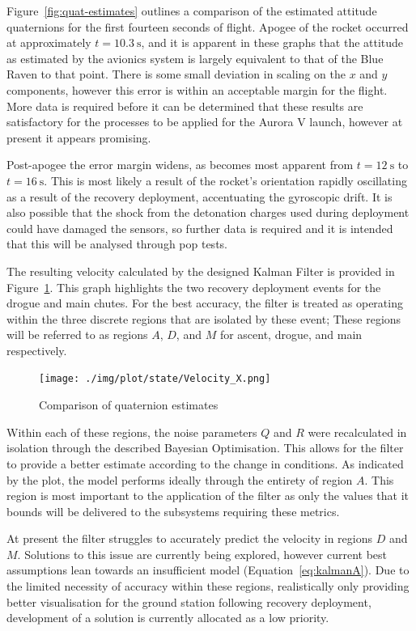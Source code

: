 Figure~\ref{fig:quat-estimates} outlines a comparison of the estimated attitude quaternions for the first fourteen seconds of flight. Apogee of the rocket occurred at approximately $t=\SI{10.3}{\second}$, and it is apparent in these graphs that the attitude as estimated by the avionics system is largely equivalent to that of the Blue Raven to that point. There is some small deviation in scaling on the $x$ and $y$ components, however this error is within an acceptable margin for the flight. More data is required before it can be determined that these results are satisfactory for the processes to be applied for the Aurora V launch, however at present it appears promising.

Post-apogee the error margin widens, as becomes most apparent from $t=\SI{12}{\second}$ to $t=\SI{16}{\second}$. This is most likely a result of the rocket's orientation rapidly oscillating as a result of the recovery deployment, accentuating the gyroscopic drift. It is also possible that the shock from the detonation charges used during deployment could have damaged the sensors, so further data is required and it is intended that this will be analysed through pop tests.

The resulting velocity calculated by the designed Kalman Filter is provided in Figure~\ref{fig:kalman}. This graph highlights the two recovery deployment events for the drogue and main chutes. For the best accuracy, the filter is treated as operating within the three discrete regions that are isolated by these event; These regions will be referred to as regions $A$, $D$, and $M$ for ascent, drogue, and main respectively.

\begin{figure}[ht!]
  \centering
  \texttt{[image: ./img/plot/state/Velocity\_X.png]}
  \caption{Comparison of quaternion estimates}\label{fig:kalman}
\end{figure}

Within each of these regions, the noise parameters $Q$ and $R$ were recalculated in isolation through the described Bayesian Optimisation. This allows for the filter to provide a better estimate according to the change in conditions. As indicated by the plot, the model performs ideally through the entirety of region $A$. This region is most important to the application of the filter as only the values that it bounds will be delivered to the subsystems requiring these metrics. 

At present the filter struggles to accurately predict the velocity in regions $D$ and $M$. Solutions to this issue are currently being explored, however current best assumptions lean towards an insufficient model (Equation~\ref{eq:kalmanA}). Due to the limited necessity of accuracy within these regions, realistically only providing better visualisation for the ground station following recovery deployment, development of a solution is currently allocated as a low priority.

